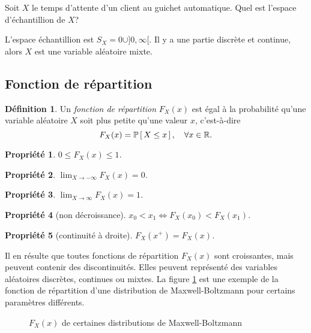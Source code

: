 \documentclass[11pt]{article}
\makeatletter
\renewcommand\P[1]{%
	\ensuremath{%
		\mathbb{P}\left[\,#1\,\right]%
	}%
}%
\newtheorem{property}{Propriété}
\theoremstyle{remark}
\theoremstyle{definition}
\newtheorem*{@definition}{Définition}
\newenvironment{definition}{%
	\begin{@definition}%
}{%
	\end{@definition}%
	\setcounter{property}{0}%
}
\makeatother
\begin{document}
\begin{exemple}
	Soit $X$ le temps d'attente d'un client au guichet automatique. Quel est
	l'espace d'échantillion de $X$?

	L'espace échantillion est $S_X={0}\cup]0,\infty[$. Il y a une partie
	discrète et continue, alors $X$ est une variable aléatoire mixte.
\end{exemple}

\subsection{Fonction de répartition}
\begin{definition}
	Un \textit{fonction de répartition} $F_X(x)$ est égal à la probabilité
	qu'une variable aléatoire $X$ soit plus petite qu'une valeur $x$,
	c'est-à-dire
	\begin{equation*}
		F_X(x)=\P{X\leq x},\quad\forall x\in\mathbb{R}.
	\end{equation*}
\end{definition}

\begin{property}
	$0\leq F_X(x)\leq 1$.
\end{property}

\begin{property}
	$\displaystyle\lim_{X\rightarrow-\infty}F_X(x)=0$.
\end{property}

\begin{property}
	$\displaystyle\lim_{X\rightarrow \infty}F_X(x)=1$.
\end{property}

\begin{property}[non décroissance]
	$x_0<x_1\Leftrightarrow F_X(x_0)<F_X(x_1)$.
\end{property}

\begin{property}[continuité à droite]
	$F_X(x^+)=F_X(x)$.
\end{property}

Il en résulte que toutes fonctions de répartition $F_X(x)$ sont croissantes,
mais peuvent contenir des discontinuités. Elles peuvent représenté des
variables aléatoires discrètes, continues ou mixtes. La figure
\ref{fig:maxwell} est une exemple de la fonction de répartition d'une
distribution de Maxwell-Boltzmann pour certains paramètres différents.

\begin{figure}[H]
	\centering
	\caption{$F_X(x)$ de certaines distributions de Maxwell-Boltzmann}
	
	\label{fig:maxwell}
\end{figure}
\end{document}
